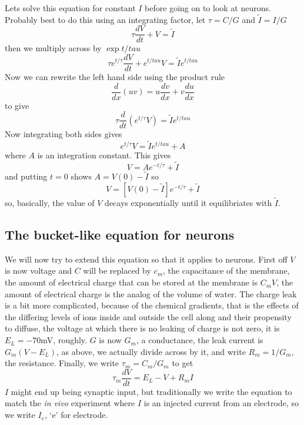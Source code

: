 \documentclass[11pt,a4paper]{scrartcl}
\begin{document}
Lets solve this equation for constant $I$ before going on to look at
neurons. Probably best to do this using an integrating factor, let
$\tau=C/G$ and $\tilde{I}=I/G$
\begin{equation}
\tau\frac{dV}{dt}+V=\tilde{I}
\end{equation}
then we multiply across by $\exp{t/tau}$
\begin{equation}
\tau e^{t/\tau}\frac{dV}{dt}+e^{t/tau}V=\tilde{I}e^{t/tau}
\end{equation}
Now we can rewrite the left hand side using the product rule
\begin{equation}
\frac{d}{dx}(uv)=u\frac{dv}{dx}+v\frac{du}{dx}
\end{equation}
to give
\begin{equation}
\tau\frac{d}{dt}\left(e^{t/\tau}V\right)=\tilde{I}e^{t/tau}
\end{equation}
Now integrating both sides gives
\begin{equation}
e^{t/\tau}V=\tilde{I}e^{t/tau}+A
\end{equation}
where $A$ is an integration constant. This gives
\begin{equation}
V=Ae^{-t/\tau}+\tilde{I}
\end{equation}
and putting $t=0$ shows $A=V(0)-\tilde{I}$ so
\begin{equation}
V=[V(0)-\tilde{I}]e^{-t/\tau}+\tilde{I}
\end{equation}
so, basically, the value of $V$ decays exponentially until it equilibriates with $\tilde{I}$.

\subsection*{The bucket-like equation for neurons}

We will now try to extend this equation so that it applies to
neurons. First off $V$ is now voltage and $C$ will be replaced by
$c_m$, the capacitance of the membrane, the amount of electrical
charge that can be stored at the membrane is $C_mV$, the amount of
electrical charge is the analog of the volume of water. The charge
leak is a bit more complicated, because of the chemical gradients,
that is the effects of the differing levels of ions inside and outside
the cell along and their propensity to diffuse, the voltage at which
there is no leaking of charge is not zero, it is $E_L=-70 $mV,
roughly.  $G$ is now $G_m$, a conductance, the leak current
is $G_m(V-E_L)$, as above, we actually divide across by it, and write
$R_m=1/G_m$, the resistance. Finally, we write $\tau_m=C_m/G_m$ to get
\begin{equation}
\tau_m\frac{dV}{dt}=E_L-V+R_mI
\end{equation}
$I$ might end up being synaptic input, but traditionally we write the
equation to match the \textsl{in vivo} experiment where $I$ is an
injected current from an electrode, so we write $I_e$, \lq{}e\rq{} for
electrode.
\end{document}
